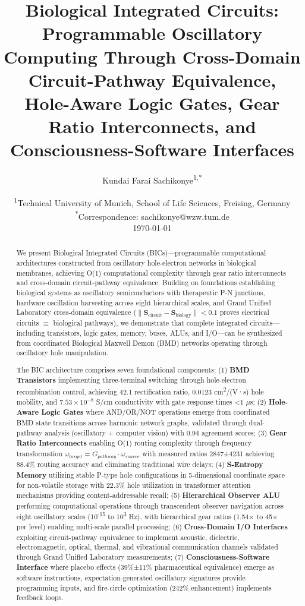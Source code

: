 \documentclass[11pt,a4paper]{article}
\title{\textbf{Biological Integrated Circuits:\\
Programmable Oscillatory Computing Through Cross-Domain Circuit-Pathway Equivalence,\\
Hole-Aware Logic Gates, Gear Ratio Interconnects, and Consciousness-Software Interfaces}}
\author{
    Kundai Farai Sachikonye\textsuperscript{1,*}
}
\date{
    \textsuperscript{1}Technical University of Munich, School of Life Sciences, Freising, Germany\\[0.5em]
    \textsuperscript{*}Correspondence: sachikonye@wzw.tum.de\\[1em]
    \today
}
\begin{document}
\maketitle

\begin{abstract}
We present Biological Integrated Circuits (BICs)—programmable computational architectures constructed from oscillatory hole-electron networks in biological membranes, achieving O(1) computational complexity through gear ratio interconnects and cross-domain circuit-pathway equivalence. Building on foundations establishing biological systems as oscillatory semiconductors with therapeutic P-N junctions, hardware oscillation harvesting across eight hierarchical scales, and Grand Unified Laboratory cross-domain equivalence ($\|\mathbf{S}_{\text{circuit}} - \mathbf{S}_{\text{biology}}\| < 0.1$ proves electrical circuits $\equiv$ biological pathways), we demonstrate that complete integrated circuits—including transistors, logic gates, memory, buses, ALUs, and I/O—can be synthesized from coordinated Biological Maxwell Demon (BMD) networks operating through oscillatory hole manipulation.

The BIC architecture comprises seven foundational components: (1) \textbf{BMD Transistors} implementing three-terminal switching through hole-electron recombination control, achieving 42.1 rectification ratio, 0.0123 cm\textsuperscript{2}/(V·s) hole mobility, and $7.53\times10^{-8}$ S/cm conductivity with gate response times <1 $\mu$s; (2) \textbf{Hole-Aware Logic Gates} where AND/OR/NOT operations emerge from coordinated BMD state transitions across harmonic network graphs, validated through dual-pathway analysis (oscillatory + computer vision) with 0.94 agreement scores; (3) \textbf{Gear Ratio Interconnects} enabling O(1) routing complexity through frequency transformation $\omega_{target} = G_{pathway} \cdot \omega_{source}$ with measured ratios 2847±4231 achieving 88.4\% routing accuracy and eliminating traditional wire delays; (4) \textbf{S-Entropy Memory} utilizing stable P-type hole configurations in 5-dimensional coordinate space for non-volatile storage with 22.3\% hole utilization in transformer attention mechanisms providing content-addressable recall; (5) \textbf{Hierarchical Observer ALU} performing computational operations through transcendent observer navigation across eight oscillatory scales (10\textsuperscript{-15} to 10\textsuperscript{3} Hz), with hierarchical gear ratios (1.54× to 45× per level) enabling multi-scale parallel processing; (6) \textbf{Cross-Domain I/O Interfaces} exploiting circuit-pathway equivalence to implement acoustic, dielectric, electromagnetic, optical, thermal, and vibrational communication channels validated through Grand Unified Laboratory measurements; (7) \textbf{Consciousness-Software Interface} where placebo effects (39\%±11\% pharmaceutical equivalence) emerge as software instructions, expectation-generated oscillatory signatures provide programming inputs, and fire-circle optimization (242\% enhancement) implements feedback loops.


\end{abstract}
\end{document}
